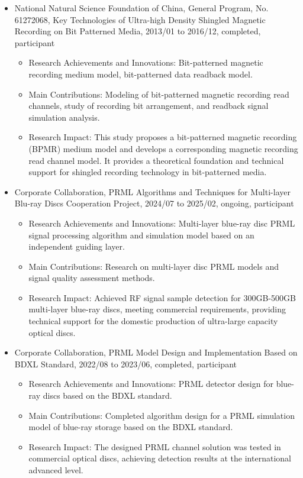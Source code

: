 \documentclass[en]{resume}
\begin{document}
\begin{itemize}
  \item National Natural Science Foundation of China, General Program, No. 61272068, Key Technologies of Ultra-high Density Shingled Magnetic Recording on Bit Patterned Media, 2013/01 to 2016/12, completed, participant
  \begin{itemize}
    \item Research Achievements and Innovations: Bit-patterned magnetic recording medium model, bit-patterned data readback model.
    \item Main Contributions: Modeling of bit-patterned magnetic recording read channels, study of recording bit arrangement, and readback signal simulation analysis.
    \item Research Impact: This study proposes a bit-patterned magnetic recording (BPMR) medium model and develops a corresponding magnetic recording read channel model. It provides a theoretical foundation and technical support for shingled recording technology in bit-patterned media.
  \end{itemize}
  
  \item Corporate Collaboration, PRML Algorithms and Techniques for Multi-layer Blu-ray Discs Cooperation Project, 2024/07 to 2025/02, ongoing, participant
  \begin{itemize}
    \item Research Achievements and Innovations: Multi-layer blue-ray disc PRML signal processing algorithm and simulation model based on an independent guiding layer.
    \item Main Contributions: Research on multi-layer disc PRML models and signal quality assessment methods.
    \item Research Impact: Achieved RF signal sample detection for 300GB-500GB multi-layer blue-ray discs, meeting commercial requirements, providing technical support for the domestic production of ultra-large capacity optical discs.
  \end{itemize}

  \item Corporate Collaboration, PRML Model Design and Implementation Based on BDXL Standard, 2022/08 to 2023/06, completed, participant
  \begin{itemize}
    \item Research Achievements and Innovations: PRML detector design for blue-ray discs based on the BDXL standard.
    \item Main Contributions: Completed algorithm design for a PRML simulation model of blue-ray storage based on the BDXL standard.
    \item Research Impact: The designed PRML channel solution was tested in commercial optical discs, achieving detection results at the international advanced level.
  \end{itemize}


\end{itemize}
\end{document}
